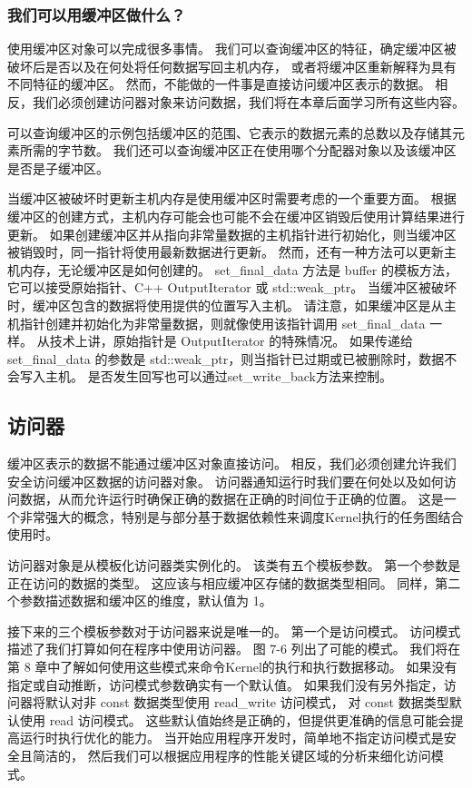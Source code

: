 \subsubsection{我们可以用缓冲区做什么？}
使用缓冲区对象可以完成很多事情。 我们可以查询缓冲区的特征，确定缓冲区被破坏后是否以及在何处将任何数据写回主机内存，
或者将缓冲区重新解释为具有不同特征的缓冲区。 然而，不能做的一件事是直接访问缓冲区表示的数据。 
相反，我们必须创建访问器对象来访问数据，我们将在本章后面学习所有这些内容。

可以查询缓冲区的示例包括缓冲区的范围、它表示的数据元素的总数以及存储其元素所需的字节数。 
我们还可以查询缓冲区正在使用哪个分配器对象以及该缓冲区是否是子缓冲区。

当缓冲区被破坏时更新主机内存是使用缓冲区时需要考虑的一个重要方面。 
根据缓冲区的创建方式，主机内存可能会也可能不会在缓冲区销毁后使用计算结果进行更新。 
如果创建缓冲区并从指向非常量数据的主机指针进行初始化，则当缓冲区被销毁时，同一指针将使用最新数据进行更新。 
然而，还有一种方法可以更新主机内存，无论缓冲区是如何创建的。 
set\_final\_data 方法是 buffer 的模板方法，它可以接受原始指针、C++ OutputIterator 或 std::weak\_ptr。 
当缓冲区被破坏时，缓冲区包含的数据将使用提供的位置写入主机。 
请注意，如果缓冲区是从主机指针创建并初始化为非常量数据，则就像使用该指针调用 set\_final\_data 一样。 
从技术上讲，原始指针是 OutputIterator 的特殊情况。 
如果传递给 set\_final\_data 的参数是 std::weak\_ptr，则当指针已过期或已被删除时，数据不会写入主机。 
是否发生回写也可以通过set\_write\_back方法来控制。

\subsection{访问器}
缓冲区表示的数据不能通过缓冲区对象直接访问。 相反，我们必须创建允许我们安全访问缓冲区数据的访问器对象。 
访问器通知运行时我们要在何处以及如何访问数据，从而允许运行时确保正确的数据在正确的时间位于正确的位置。 
这是一个非常强大的概念，特别是与部分基于数据依赖性来调度Kernel执行的任务图结合使用时。

访问器对象是从模板化访问器类实例化的。 该类有五个模板参数。 第一个参数是正在访问的数据的类型。 
这应该与相应缓冲区存储的数据类型相同。 同样，第二个参数描述数据和缓冲区的维度，默认值为 1。

接下来的三个模板参数对于访问器来说是唯一的。 第一个是访问模式。 访问模式描述了我们打算如何在程序中使用访问器。 
图 7-6 列出了可能的模式。 我们将在第 8 章中了解如何使用这些模式来命令Kernel的执行和执行数据移动。
如果没有指定或自动推断，访问模式参数确实有一个默认值。 
如果我们没有另外指定，访问器将默认对非 const 数据类型使用 read\_write 访问模式，
对 const 数据类型默认使用 read 访问模式。 
这些默认值始终是正确的，但提供更准确的信息可能会提高运行时执行优化的能力。 
当开始应用程序开发时，简单地不指定访问模式是安全且简洁的，
然后我们可以根据应用程序的性能关键区域的分析来细化访问模式。

